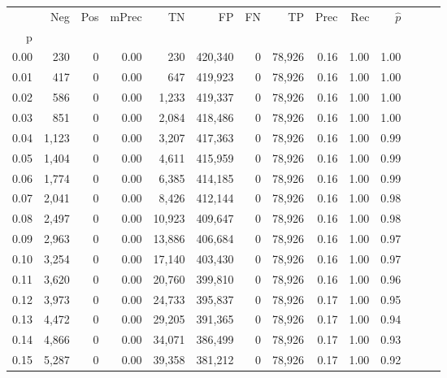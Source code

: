 \begin{tabular}{rrrrrrrrrrrrrr}
\toprule
{} &    Neg &    Pos & mPrec &       TN &       FP &      FN &      TP &  Prec &   Rec & $\hat{p}$ \\
p    &        &        &       &          &          &         &         &       &       &           \\
\midrule
0.00 &    230 &      0 &  0.00 &      230 &  420,340 &       0 &  78,926 &  0.16 &  1.00 &      1.00 \\
0.01 &    417 &      0 &  0.00 &      647 &  419,923 &       0 &  78,926 &  0.16 &  1.00 &      1.00 \\
0.02 &    586 &      0 &  0.00 &    1,233 &  419,337 &       0 &  78,926 &  0.16 &  1.00 &      1.00 \\
0.03 &    851 &      0 &  0.00 &    2,084 &  418,486 &       0 &  78,926 &  0.16 &  1.00 &      1.00 \\
0.04 &  1,123 &      0 &  0.00 &    3,207 &  417,363 &       0 &  78,926 &  0.16 &  1.00 &      0.99 \\
0.05 &  1,404 &      0 &  0.00 &    4,611 &  415,959 &       0 &  78,926 &  0.16 &  1.00 &      0.99 \\
0.06 &  1,774 &      0 &  0.00 &    6,385 &  414,185 &       0 &  78,926 &  0.16 &  1.00 &      0.99 \\
0.07 &  2,041 &      0 &  0.00 &    8,426 &  412,144 &       0 &  78,926 &  0.16 &  1.00 &      0.98 \\
0.08 &  2,497 &      0 &  0.00 &   10,923 &  409,647 &       0 &  78,926 &  0.16 &  1.00 &      0.98 \\
0.09 &  2,963 &      0 &  0.00 &   13,886 &  406,684 &       0 &  78,926 &  0.16 &  1.00 &      0.97 \\
0.10 &  3,254 &      0 &  0.00 &   17,140 &  403,430 &       0 &  78,926 &  0.16 &  1.00 &      0.97 \\
0.11 &  3,620 &      0 &  0.00 &   20,760 &  399,810 &       0 &  78,926 &  0.16 &  1.00 &      0.96 \\
0.12 &  3,973 &      0 &  0.00 &   24,733 &  395,837 &       0 &  78,926 &  0.17 &  1.00 &      0.95 \\
0.13 &  4,472 &      0 &  0.00 &   29,205 &  391,365 &       0 &  78,926 &  0.17 &  1.00 &      0.94 \\
0.14 &  4,866 &      0 &  0.00 &   34,071 &  386,499 &       0 &  78,926 &  0.17 &  1.00 &      0.93 \\
0.15 &  5,287 &      0 &  0.00 &   39,358 &  381,212 &       0 &  78,926 &  0.17 &  1.00 &      0.92 \\

\end{tabular}
